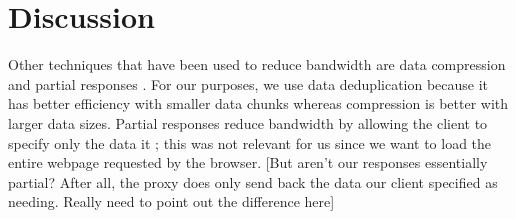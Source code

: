 \section{Discussion}
\label{sec:discussion}
Other techniques that have been used to reduce bandwidth are data compression \cite{?} and partial responses \cite{?}. For our purposes, we use data deduplication because it has better efficiency with smaller data chunks whereas compression is better with larger data sizes. Partial responses reduce bandwidth by allowing the client to specify only the data it ; this was not relevant for us since we want to load the entire webpage requested by the browser. [But aren't our responses essentially partial? After all, the proxy does only send back the data our client specified as needing. Really need to point out the difference here]
